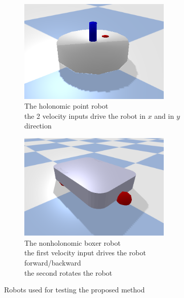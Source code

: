 \begin{figure}[H]
    \centering
    \begin{subfigure}{.5\textwidth}
    \centering
    \includegraphics[width=0.8\textwidth]{figures/point_robot.png}
    \caption{The holonomic point robot\\the 2 velocity inputs drive the robot in $x$ and in $y$ direction}%
    \label{subfig:example_point_robot}
    \end{subfigure}%
    \begin{subfigure}{.5\textwidth}
    \centering
    \includegraphics[width=0.8\textwidth]{figures/boxer_robot.png}
    \caption{The nonholonomic boxer robot\\the first velocity input drives the robot forward/backward\\the second rotates the robot}%
    \label{subfig:example_boxer_robot}
    \end{subfigure}%
    \caption{Robots used for testing the proposed method}%
    \label{fig:example_robots}
\end{figure}

